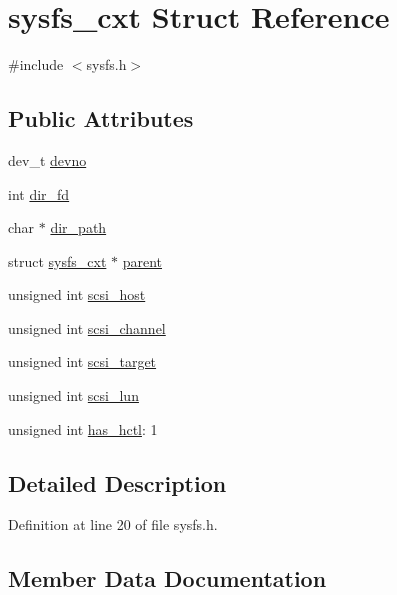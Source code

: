 \hypertarget{structsysfs__cxt}{}\section{sysfs\+\_\+cxt Struct Reference}
\label{structsysfs__cxt}


{\ttfamily \#include $<$sysfs.\+h$>$}

\subsection*{Public Attributes}
\begin{DoxyCompactItemize}
\item 
dev\+\_\+t \hyperlink{structsysfs__cxt_ad401b387836fd6aa765984a978886b1b}{devno}
\item 
int \hyperlink{structsysfs__cxt_a9aba9f43a1810685449b830b600d01fc}{dir\+\_\+fd}
\item 
char $\ast$ \hyperlink{structsysfs__cxt_a79631d9695127c07b6ce1db7b28d9352}{dir\+\_\+path}
\item 
struct \hyperlink{structsysfs__cxt}{sysfs\+\_\+cxt} $\ast$ \hyperlink{structsysfs__cxt_a5249e4e5905ac5fe6e55bbc2f3015da9}{parent}
\item 
unsigned int \hyperlink{structsysfs__cxt_ac1c78a0935261e3efca612863c7405c0}{scsi\+\_\+host}
\item 
unsigned int \hyperlink{structsysfs__cxt_a1e05f9b952073571e3549605511bca82}{scsi\+\_\+channel}
\item 
unsigned int \hyperlink{structsysfs__cxt_a1db1f90d3baf894e7d18c32cb136c6da}{scsi\+\_\+target}
\item 
unsigned int \hyperlink{structsysfs__cxt_a33997ca225c5bbb239ce87424c8be581}{scsi\+\_\+lun}
\item 
unsigned int \hyperlink{structsysfs__cxt_a5b9652046e69bbb0b73f0020e7550899}{has\+\_\+hctl}\+: 1
\end{DoxyCompactItemize}


\subsection{Detailed Description}


Definition at line 20 of file sysfs.\+h.



\subsection{Member Data Documentation}
\mbox{\label{structsysfs__cxt_ad401b387836fd6aa765984a978886b1b}} 
